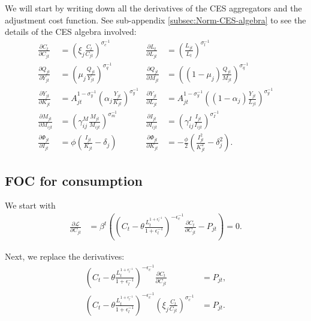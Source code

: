 We will start by writing down all the derivatives of the CES aggregators
and the adjustment cost function. See sub-appendix \ref{subsec:Norm-CES-algebra}
to see the details of the CES algebra involved: 
\begin{align*}
\frac{\partial C_{t}}{\partial C_{jt}} & =\left(\xi_{j}\frac{{C_{t}}}{C_{jt}}\right)^{\sigma_{c}^{-1}} & \frac{\partial L_{t}}{\partial L_{jt}} & =\left(\frac{{L_{jt}}}{L_{t}}\right)^{\sigma_{l}^{-1}}\\
\frac{\partial Q_{jt}}{\partial Y_{jt}} & =\left(\mu_{j}\frac{{Q_{jt}}}{Y_{jt}}\right)^{\sigma_{q}^{-1}} & \frac{\partial Q_{jt}}{\partial M_{jt}} & =\left(\left(1-\mu_{j}\right)\frac{{Q_{jt}}}{M_{jt}}\right)^{\sigma_{q}^{-1}}\\
\frac{\partial Y_{jt}}{\partial K_{jt}} & =A_{jt}^{1-\sigma_{y}^{-1}}\left(\alpha_{j}\frac{{Y_{jt}}}{K_{jt}}\right)^{\sigma_{y}^{-1}} & \frac{\partial Y_{jt}}{\partial L_{jt}} & =A_{jt}^{1-\sigma_{y}^{-1}}\left(\left(1-\alpha_{j}\right)\frac{{Y_{jt}}}{L_{jt}}\right)^{\sigma_{y}^{-1}}\\
\frac{\partial M_{jt}}{\partial M_{ijt}} & =\left(\gamma_{ij}^{M}\frac{{M_{jt}}}{M_{ijt}}\right)^{\sigma_{m}^{-1}} & \frac{\partial I_{jt}}{\partial I_{ijt}} & =\left(\gamma_{ij}^{I}\frac{{I_{jt}}}{I_{ijt}}\right)^{\sigma_{I}^{-1}}\\
\frac{\partial\Phi_{jt}}{\partial I_{jt}} & =\phi\left(\frac{I_{jt}}{K_{jt}}-\delta_{j}\right) & \frac{\partial\Phi_{jt}}{\partial K_{jt}} & =-\frac{\phi}{2}\left(\frac{I_{jt}^{2}}{K_{jt}^{2}}-\delta_{j}^{2}\right).
\end{align*}


\subsection{FOC for consumption}

We start with
\begin{align*}
\frac{\partial\mathcal{{L}}}{\partial C_{jt}} & =\beta^{t}\left(\left(C_{t}-\theta\frac{L_{t}^{1+\epsilon_{l}^{-1}}}{1+\epsilon_{l}^{-1}}\right)^{-\epsilon_{c}^{-1}}\frac{\partial C_{t}}{\partial C_{jt}}-P_{jt}\right)=0.
\end{align*}

Next, we replace the derivatives:
\begin{align*}
\left(C_{t}-\theta\frac{L_{t}^{1+\epsilon_{l}^{-1}}}{1+\epsilon_{l}^{-1}}\right)^{-\epsilon_{c}^{-1}}\frac{\partial C_{t}}{\partial C_{jt}} & =P_{jt},\\
\left(C_{t}-\theta\frac{L_{t}^{1+\epsilon_{l}^{-1}}}{1+\epsilon_{l}^{-1}}\right)^{-\epsilon_{c}^{-1}}\left(\xi_{j}\frac{{C_{t}}}{C_{jt}}\right)^{\sigma_{c}^{-1}} & =P_{jt}.
\end{align*}


